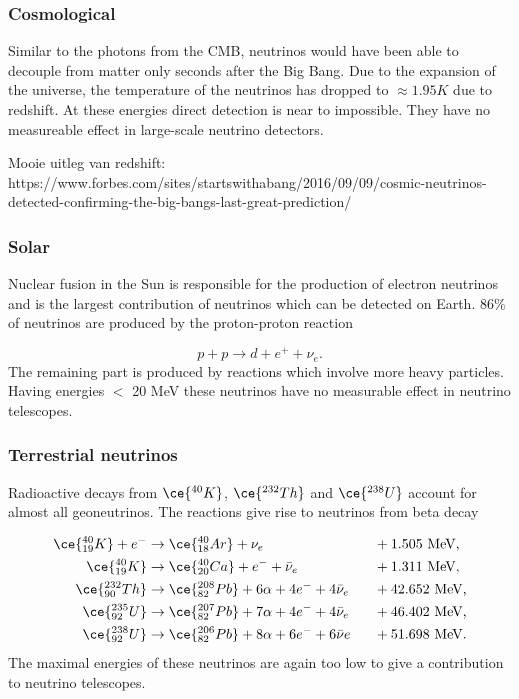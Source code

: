 \subsubsection{Cosmological}
Similar to the photons from the CMB, neutrinos would have been able to decouple from matter only seconds after the Big Bang. Due to the expansion of the universe, the temperature of the neutrinos has dropped to $\approx 1.95K$ due to redshift. At these energies direct detection is near to impossible. They have no measureable effect in large-scale neutrino detectors.
 
Mooie uitleg van redshift: https://www.forbes.com/sites/startswithabang/2016/09/09/cosmic-neutrinos-detected-confirming-the-big-bangs-last-great-prediction/
\subsubsection{Solar}
Nuclear fusion in the Sun is responsible for the production of electron neutrinos and is the largest contribution of neutrinos which can be detected on Earth. 86\% of neutrinos are produced by the proton-proton reaction

\begin{equation}
p + p \rightarrow d + e^+ + \nu_e.
\end{equation}
The remaining part is produced by reactions which involve more heavy particles. Having energies $<$ 20 MeV these neutrinos have no measurable effect in neutrino telescopes.
\subsubsection{Terrestrial neutrinos}
Radioactive decays from $\ce{^{40}K}$, $\ce{^{232}Th}$ and $\ce{^{238}U}$ account for almost all geoneutrinos. The reactions give rise to neutrinos from beta decay \cite{Wan:2016nhe}

\begin{alignat}{2}
\ce{^{40}_{19}K} + e^- &\rightarrow \ce{^{40}_{18}Ar} + \nu_e \ \ &&+1.505 \textrm{ MeV,}\\
\ce{^{40}_{19}K} &\rightarrow \ce{^{40}_{20}Ca} +e^- + \bar{\nu}_e \ \ &&+1.311 \textrm{ MeV,}\\
\ce{^{232}_{90}Th} &\rightarrow \ce{^{208}_{82}Pb} +6\alpha + 4e^- +4\bar{\nu}_e\ \ &&+42.652 \textrm{ MeV,} \\
\ce{^{235}_{92}U} &\rightarrow \ce{^{207}_{82}Pb} + 7\alpha + 4e^- + 4\bar{\nu}_e \ \ &&+46.402 \textrm{ MeV,}\\
\ce{^{238}_{92}U} &\rightarrow \ce{^{206}_{82}Pb} +8\alpha +6e^- + 6\bar{\nu}e \ \ &&+51.698 \textrm{ MeV.}
\end{alignat}
The maximal energies of these neutrinos are again too low to give a contribution to neutrino telescopes.

